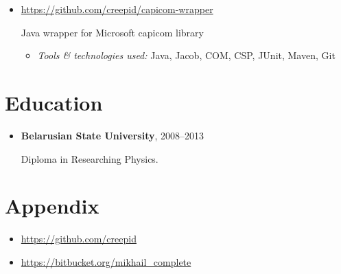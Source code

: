 \documentclass[a4paper, 12pt]{article}
\newcommand{\position}[1]{
    \textbf{#1}}
\newcommand{\itemlabel}[1]{
    \textit{#1:}}
\begin{document}
\begin{itemize}
            \item \href{https://github.com/creepid/capicom-wrapper}{https://github.com/creepid/capicom-wrapper}

           Java wrapper for Microsoft capicom library

            \begin{itemize}
                \item \itemlabel{Tools \& technologies used} Java, Jacob,  COM, CSP, JUnit, Maven, Git
            \end{itemize}
            
    \end{itemize}    

\section*{Education}

    \begin{itemize}

        \item \position{Belarusian State University}, 2008--2013

            Diploma in Researching Physics.

    \end{itemize}

\section*{Appendix}

    \begin{itemize}
        \item \href{https://github.com/creepid}{https://github.com/creepid}
    \end{itemize}
        \begin{itemize}
        \item \href{https://bitbucket.org/mikhail_complete}{https://bitbucket.org/mikhail\_complete}
    \end{itemize}
\end{document}

